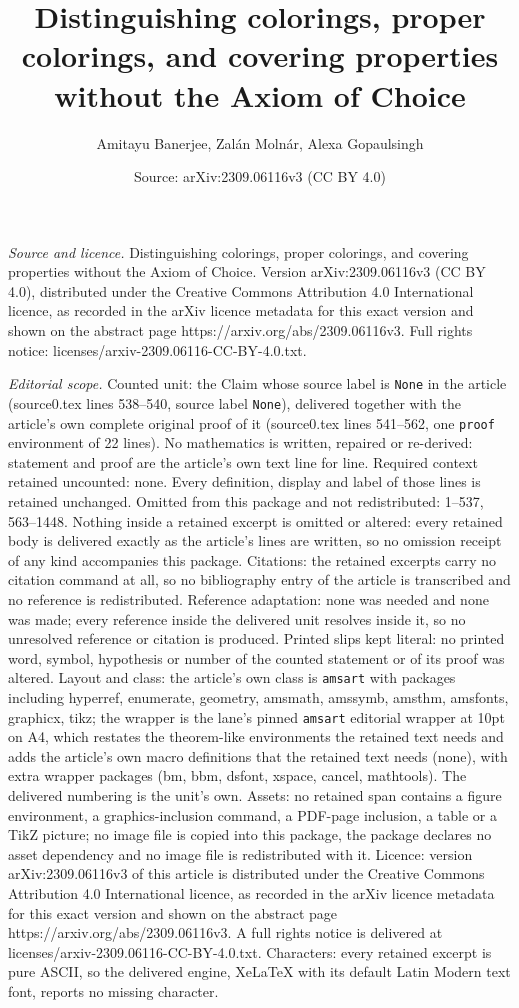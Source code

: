 \documentclass[10pt,a4paper]{amsart}
\title[Distinguishing colorings, proper colorings, and covering pro]{Distinguishing colorings, proper colorings, and covering properties without the Axiom of Choice}
\author{Amitayu Banerjee, Zal\'an Moln\'ar, Alexa Gopaulsingh}
\date{Source: arXiv:2309.06116v3 (CC BY 4.0)}
\begin{document}
\maketitle

\noindent\emph{Source and licence.} Distinguishing colorings, proper colorings, and covering properties without the Axiom of Choice. Version arXiv:2309.06116v3 (CC BY 4.0), distributed under the Creative Commons Attribution 4.0 International licence, as recorded in the arXiv licence metadata for this exact version and shown on the abstract page https://arxiv.org/abs/2309.06116v3. Full rights notice: licenses/arxiv-2309.06116-CC-BY-4.0.txt.\par\smallskip

\noindent\textit{Editorial scope.} Counted unit: the Claim whose source label is \texttt{None} in the article (source0.tex lines 538--540, source label \texttt{None}), delivered together with the article's own complete original proof of it (source0.tex lines 541--562, one \texttt{proof} environment of 22 lines). No mathematics is written, repaired or re-derived: statement and proof are the article's own text line for line. Required context retained uncounted: none. Every definition, display and label of those lines is retained unchanged. Omitted from this package and not redistributed: 1--537, 563--1448. Nothing inside a retained excerpt is omitted or altered: every retained body is delivered exactly as the article's lines are written, so no omission receipt of any kind accompanies this package. Citations: the retained excerpts carry no citation command at all, so no bibliography entry of the article is transcribed and no reference is redistributed. Reference adaptation: none was needed and none was made; every reference inside the delivered unit resolves inside it, so no unresolved reference or citation is produced. Printed slips kept literal: no printed word, symbol, hypothesis or number of the counted statement or of its proof was altered. Layout and class: the article's own class is \texttt{amsart} with packages including hyperref, enumerate, geometry, amsmath, amssymb, amsthm, amsfonts, graphicx, tikz; the wrapper is the lane's pinned \texttt{amsart} editorial wrapper at 10pt on A4, which restates the theorem-like environments the retained text needs and adds the article's own macro definitions that the retained text needs (none), with extra wrapper packages (bm, bbm, dsfont, xspace, cancel, mathtools). The delivered numbering is the unit's own. Assets: no retained span contains a figure environment, a graphics-inclusion command, a PDF-page inclusion, a table or a TikZ picture; no image file is copied into this package, the package declares no asset dependency and no image file is redistributed with it. Licence: version arXiv:2309.06116v3 of this article is distributed under the Creative Commons Attribution 4.0 International licence, as recorded in the arXiv licence metadata for this exact version and shown on the abstract page https://arxiv.org/abs/2309.06116v3. A full rights notice is delivered at licenses/arxiv-2309.06116-CC-BY-4.0.txt. Characters: every retained excerpt is pure ASCII, so the delivered engine, XeLaTeX with its default Latin Modern text font, reports no missing character.
\end{document}

